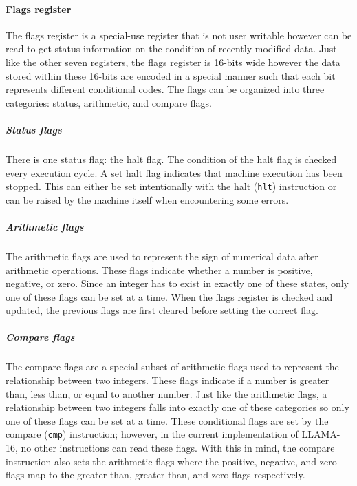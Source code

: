\documentclass[man,hidelinks,floatsintext]{apa7}
\begin{document}
\paragraph{Flags register}
The flags register is a special-use register that is not user writable however can be read to get status information on the condition of recently modified data. Just like the other seven registers, the flags register is 16-bits wide however the data stored within these 16-bits are encoded in a special manner such that each bit represents different conditional codes. The flags can be organized into three categories: status, arithmetic, and compare flags.
\subparagraph{Status flags}
There is one status flag: the halt flag. The condition of the halt flag is checked every execution cycle. A set halt flag indicates that machine execution has been stopped. This can either be set intentionally with the halt (\verb|hlt|) instruction or can be raised by the machine itself when encountering some errors.
\subparagraph{Arithmetic flags}
The arithmetic flags are used to represent the sign of numerical data after arithmetic operations. These flags indicate whether a number is positive, negative, or zero. Since an integer has to exist in exactly one of these states, only one of these flags can be set at a time. When the flags register is checked and updated, the previous flags are first cleared before setting the correct flag.
\subparagraph{Compare flags}
The compare flags are a special subset of arithmetic flags used to represent the relationship between two integers. These flags indicate if a number is greater than, less than, or equal to another number. Just like the arithmetic flags, a relationship between two integers falls into exactly one of these categories so only one of these flags can be set at a time. These conditional flags are set by the compare (\verb|cmp|) instruction; however, in the current implementation of LLAMA-16, no other instructions can read these flags. With this in mind, the compare instruction also sets the arithmetic flags where the positive, negative, and zero flags map to the greater than, greater than, and zero flags respectively.
\end{document}
